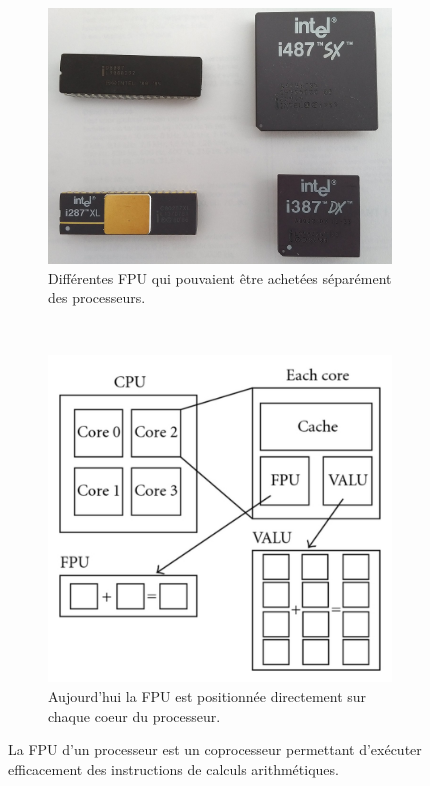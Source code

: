         

        \begin{figure}
            \centering
            \begin{subfigure}[b]{0.45\linewidth}
                \includegraphics[width=\linewidth]{images/cpu_fpu.jpg}
                \caption{Différentes FPU qui pouvaient être achetées séparément des processeurs.}
                \label{pic_cpu_fpu}
            \end{subfigure}
            ~ %
            \begin{subfigure}[b]{0.45\linewidth}
                \includegraphics[width=\linewidth]{images/cpu_fpu_recent.png}
                \caption{Aujourd'hui la FPU est positionnée directement sur chaque coeur du processeur.}
                \label{pic_cpu_fpu_recent}
            \end{subfigure}
            \caption{La FPU d'un processeur est un coprocesseur permettant d'exécuter efficacement des instructions de calculs arithmétiques. }\label{fig:cacheinclusionpolicy}
        \end{figure}
        
